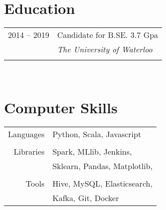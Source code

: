 \documentclass[11pt]{article} %
\begin{document}
{\begin{minipage}[t]{0.52\textwidth}

\section{Education}

\begin{tabular}{rl} %


2014 -- 2019 & Candidate for \textsc{B.SE.} 3.7 Gpa \\
& \large\textit{The University of Waterloo}\\
&\\

\end{tabular}\\[10pt]



\end{minipage} %
\hfill
\begin{minipage}[t]{0.41\textwidth} %
\vspace{0pt} %



\section{Computer Skills}

\begin{tabular}{rl}
Languages
& Python, Scala, Javascript \\
& \\
Libraries
& Spark, MLlib, Jenkins, \\
& Sklearn, Pandas, Matplotlib, \\
& \\
Tools
& Hive, MySQL, Elasticsearch,\\
& Kafka, Git, Docker  \\
\end{tabular}


\end{minipage}}
\end{document}
